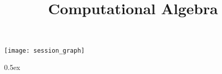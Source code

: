 \documentclass[11pt,a4paper]{article}
\begin{document}
\title{Computational Algebra}
\maketitle

\tableofcontents

\begin{center}
  \texttt{[image: session\_graph]}
\end{center}

\newpage

\renewcommand{\setisabellecontext}[1]{\markright{\href{#1.html}{#1.thy}}}

\parindent 0pt\parskip 0.5ex


\pagestyle{headings}


\end{document}
